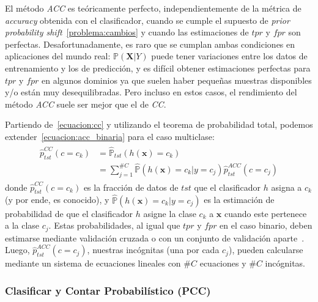 El método {\it ACC\/} es teóricamente perfecto, independientemente de la métrica
de {\it accuracy\/} obtenida con el clasificador, cuando se cumple el supuesto
de {\it prior probability shift\/}~\ref{problema:cambios} y cuando las
estimaciones de $tpr$ y $fpr$ son perfectas. Desafortunadamente, es raro que se
cumplan ambas condiciones en aplicaciones del mundo real:
$\mathbb{P}(\boldsymbol{X}|Y)$ puede tener variaciones entre los datos de
entrenamiento y los de predicción, y es difícil obtener estimaciones perfectas
para $tpr$ y $fpr$ en algunos dominios ya que suelen haber pequeñas muestras
disponibles y/o están muy desequilibradas. Pero incluso en estos casos, el
rendimiento del método {\it ACC\/} suele ser mejor que el de {\it CC}.

Partiendo de~\ref{ecuacion:cc} y utilizando el teorema de probabilidad total,
podemos extender~\ref{ecuacion:acc_binaria} para el caso multiclase:
\begin{align}
\begin{split}
    \hat p^{CC}_{tst}(c=c_k) &= \mathbb{\hat P}_{tst}(h(\boldsymbol{x})=c_k) \\
    &= \sum \limits_{j=1}^{\#C}{\mathbb{\hat P}(h(\boldsymbol{x})=c_k|y=c_j) \hat p^{ACC}_{tst}(c=c_j)}\label{ecuacion:acc_multiclase}
\end{split}
\end{align}
donde $\hat p^{CC}_{tst}(c=c_k)$ es la fracción de datos de $tst$ que el
clasificador $h$ asigna a $c_k$ (y por ende, es conocido), y $\mathbb{\hat
P}(h(\boldsymbol{x})=c_k|y=c_j)$ es la estimación de probabilidad de que el
clasificador $h$ asigne la clase $c_k$ a $\boldsymbol{x}$ cuando este pertenece
a la clase $c_j$. Estas probabilidades, al igual que $tpr$ y $fpr$ en el caso
binario, deben estimarse mediante validación cruzada o con un conjunto de
validación aparte~\cite{barranquero2013study, forman2005counting,
forman2008quantifying}. Luego, $\hat p^{ACC}_{tst}(c=c_j)$, nuestras incógnitas
(una por cada $c_j$), pueden calcularse mediante un sistema de ecuaciones
lineales con $\#C$ ecuaciones y $\#C$ incógnitas.

\subsubsection{Clasificar y Contar Probabilístico (PCC)}

